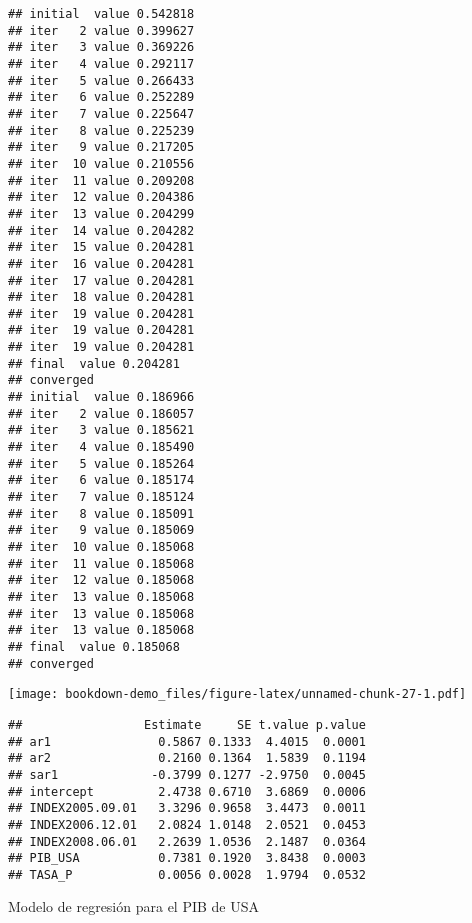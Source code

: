 \documentclass[
]{book}
\newenvironment{Shaded}{\begin{snugshade}}{\end{snugshade}}
\newcommand{\NormalTok}[1]{#1}
\newcommand{\SpecialCharTok}[1]{\textcolor[rgb]{0.00,0.00,0.00}{#1}}
\begin{document}
\begin{verbatim}
## initial  value 0.542818 
## iter   2 value 0.399627
## iter   3 value 0.369226
## iter   4 value 0.292117
## iter   5 value 0.266433
## iter   6 value 0.252289
## iter   7 value 0.225647
## iter   8 value 0.225239
## iter   9 value 0.217205
## iter  10 value 0.210556
## iter  11 value 0.209208
## iter  12 value 0.204386
## iter  13 value 0.204299
## iter  14 value 0.204282
## iter  15 value 0.204281
## iter  16 value 0.204281
## iter  17 value 0.204281
## iter  18 value 0.204281
## iter  19 value 0.204281
## iter  19 value 0.204281
## iter  19 value 0.204281
## final  value 0.204281 
## converged
## initial  value 0.186966 
## iter   2 value 0.186057
## iter   3 value 0.185621
## iter   4 value 0.185490
## iter   5 value 0.185264
## iter   6 value 0.185174
## iter   7 value 0.185124
## iter   8 value 0.185091
## iter   9 value 0.185069
## iter  10 value 0.185068
## iter  11 value 0.185068
## iter  12 value 0.185068
## iter  13 value 0.185068
## iter  13 value 0.185068
## iter  13 value 0.185068
## final  value 0.185068 
## converged
\end{verbatim}

\texttt{[image: bookdown-demo\_files/figure-latex/unnamed-chunk-27-1.pdf]}

\begin{Shaded}
\end{Shaded}

\begin{verbatim}
##                 Estimate     SE t.value p.value
## ar1               0.5867 0.1333  4.4015  0.0001
## ar2               0.2160 0.1364  1.5839  0.1194
## sar1             -0.3799 0.1277 -2.9750  0.0045
## intercept         2.4738 0.6710  3.6869  0.0006
## INDEX2005.09.01   3.3296 0.9658  3.4473  0.0011
## INDEX2006.12.01   2.0824 1.0148  2.0521  0.0453
## INDEX2008.06.01   2.2639 1.0536  2.1487  0.0364
## PIB_USA           0.7381 0.1920  3.8438  0.0003
## TASA_P            0.0056 0.0028  1.9794  0.0532
\end{verbatim}

Modelo de regresión para el PIB de USA
\end{document}
